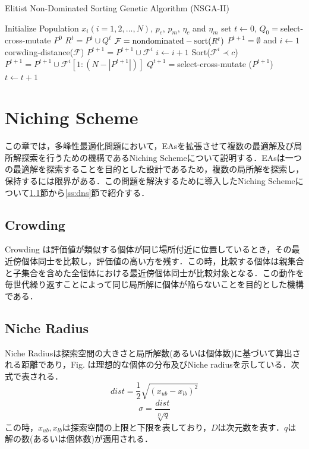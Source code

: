 \documentclass[a4j,11pt]{jarticle}
\begin{document}
\begin{algorithm}[H]
\caption{Elitist Non-Dominated Sorting Genetic Algorithm (NSGA-II)}
\label{code:nsga}
\begin{algorithmic}[3]
\REQUIRE Initialize Population $x_i (i=1, 2,..., N)$, $p_c$, $p_m$, $\eta_c$ and $\eta_m$
\STATE set $t \leftarrow 0$, $Q_0=$select-cross-mutate $P^0$
\STATE $R^t=P^t \cup Q^t$
\STATE $\mathcal{F} = {\rm nondominated-sort}(R^t)$
\STATE $P^{t+1}=\emptyset$ and $i \leftarrow 1$
\STATE corwding-distance($\mathcal{F}$)
\STATE $P^{t+1}=P^{t+1} \cup \mathcal{F}^i$
\STATE $i \leftarrow i+1$
\ENDWHILE
\STATE Sort($\mathcal{F}^i \prec c$)
\STATE $P^{t+1}=P^{t+1} \cup \mathcal{F}^i[1:(N-|P^{t+1}|)]$
\STATE $Q^{t+1}=$select-cross-mutate ($P^{t+1}$)
\STATE $t \leftarrow t+1$
\ENDWHILE 
\end{algorithmic}
\end{algorithm}

\newpage
\section{Niching Scheme}
\label{sec:ns}
この章では，多峰性最適化問題において，EAsを拡張させて複数の最適解及び局所解探索を行うための機構であるNiching Schemeについて説明する．EAsは一つの最適解を探索することを目的とした設計であるため，複数の局所解を探索し，保持するには限界がある．この問題を解決するために導入したNiching Schemeについて\ref{ss:Crowding}節から\ref{ss:dns}節で紹介する．

\subsection{Crowding}
\label{ss:Crowding}
Crowding \cite{Crowding} は評価値が類似する個体が同じ場所付近に位置しているとき，その最近傍個体同士を比較し，評価値の高い方を残す．この時，比較する個体は親集合と子集合を含めた全個体における最近傍個体同士が比較対象となる．この動作を毎世代繰り返すことによって同じ局所解に個体が陥らないことを目的とした機構である．

\subsection{Niche Radius}
\label{ss:nr}
Niche Radiusは探索空間の大きさと局所解数(あるいは個体数)に基づいて算出される距離であり，Fig. は理想的な個体の分布及びNiche radiusを示している．次式で表される．
\begin{equation}
\label{eq:nr-d}
dist=\frac{1}{2}\sqrt{(x_{ub}-x_{lb})^2}
\end{equation}
\begin{equation}
\label{eq:nr-s}
\sigma=\frac{dist}{\sqrt[D]{q}}
\end{equation}
この時，$x_{ub},x_{lb}$は探索空間の上限と下限を表しており，$D$は次元数を表す．$q$は解の数(あるいは個体数)が適用される．
\end{document}
